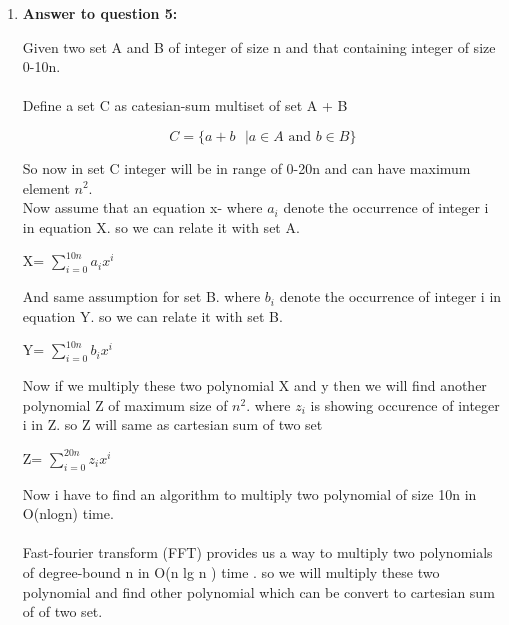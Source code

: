 \documentclass[11pt]{article}
\begin{document}
\begin{enumerate}
\item \textbf{Answer to question 5:}

Given two set A and B of integer of size n and that containing integer of size 0-10n.\\
\\
Define a set C as catesian-sum multiset of set A + B 

\begin{center}
\[C=\Big\{ a+b \text{ } | a \in A \text{ and } b \in B  \Big\}\]
\end{center}
So now in set C integer will be in range of 0-20n and can have maximum element $n^2$.\\

Now assume that an equation x- where $a_i$ denote the occurrence of integer i in equation X. so we can relate it with set A. 
\begin{center}
    X= $\sum_{i=0}^{10n} a_i x^i$
\end{center}
And same assumption for set B.  where $b_i$ denote the occurrence of integer i in equation Y. so we can relate it with set B. 
\begin{center}
    Y= $\sum_{i=0}^{10n} b_i x^i$
\end{center}
Now if we multiply these two polynomial X and y then we will find another polynomial Z of maximum size of $n^2$. where $z_i$ is showing occurence of integer i in Z.
so Z will same as cartesian sum of two set\\
\begin{center}
    Z= $\sum_{i=0}^{20n} z_i x^i$
\end{center}
Now i have to find an algorithm to multiply two polynomial of size 10n in O(nlogn) time. \\
\\
Fast-fourier transform
(FFT) provides us a way to multiply two polynomials of degree-bound n in O(n lg n ) time . so we will multiply these two polynomial and find other polynomial which can be convert to cartesian sum of of two set.




\end{enumerate}
\end{document}
